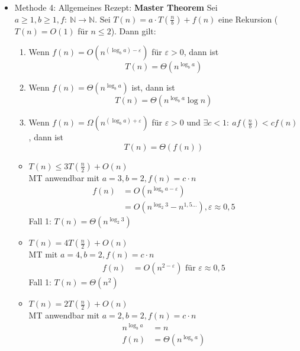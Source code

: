\begin{itemize}
\begin{itemize}
        \end{itemize}
\item   Methode 4: Allgemeines Rezept: \textbf{Master Theorem}
        \Satz Sei $a \geq 1, b \geq 1, f{:}\ \mathbb{N} \to \mathbb{N}$. Sei $T(n) = a \cdot T\left(\frac{n}{b}\right) + f(n)$ eine Rekursion ($T(n) = O(1)$ für $n \leq 2$). Dann gilt:
        \begin{enumerate}
         \item Wenn $f(n) = O(n^{(\log_b a) - \varepsilon})$ für $\varepsilon > 0$, dann ist 
                \[T(n) = \Theta(n^{\log_b a})\]
         \item Wenn $f(n) = \Theta(n^{\log_b a})$ ist, dann ist
                \[T(n) = \Theta\left(n^{\log_b a} \log n\right)\]
         \item Wenn $f(n) = \Omega(n^{(\log_b a) + \varepsilon})$ für $\varepsilon > 0$ und $\exists c < 1{:}\ a f\left(\frac{n}{b}\right) < c f\left(n\right)$, dann ist
                \[T(n) = \Theta\left(f(n)\right)\]
        \end{enumerate}
        \Bsp    \begin{itemize}
        \item   $T(n) \leq 3 T\left(\frac{n}{2}\right) + O(n)$\\
                MT anwendbar mit $a = 3, b = 2, f(n) = c \cdot n$
                \begin{align*}
                 f(n)   &= O(n^{\log_b a - \varepsilon}) \\
                        &= O(n^{\log_2 3} - n^{1{,}5...}), \varepsilon \approx 0{,}5
                \end{align*}
                Fall 1: $T(n) = \Theta(n^{\log_2 3})$
        \item   $T(n) = 4 T\left(\frac{n}{2}\right) + O(n)$ \\
                MT mit $a = 4, b = 2, f(n) = c \cdot n$
                \begin{align*}
                 f(n) &= O(n^{2 - \varepsilon}) \text{ für $\varepsilon \approx 0{,}5$}
                \end{align*}
                Fall 1: $T(n) = \Theta(n^2)$
        \item   $T(n) = 2 T\left(\frac{n}{2}\right) + O(n)$ \\
                MT anwendbar mit $a = 2, b = 2, f(n) = c \cdot n$
                \begin{align*}
                 n^{\log_b a} &= n\\
                 f(n) &= \Theta(n^{\log_b a})

\end{align*}
\end{itemize}
\end{itemize}
